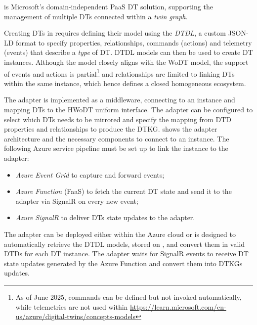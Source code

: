 \azureTwin{} is Microsoft's domain-independent \ac{PaaS} \ac{DT} solution, supporting the management of multiple \acp{DT} connected within a \emph{twin graph}.

Creating \acp{DT} in \azureTwin{} requires defining their model using the \emph{\acf{DTDL}}, a custom JSON-LD format to specify properties, relationships, commands (actions) and telemetry (events) that describe a \emph{type} of \ac{DT}.
%
\ac{DTDL} models can then be used to create \ac{DT} instances.
%
Although the model closely aligns with the \ac{WoDT} model, the support of events and actions is partial\footnote{As of June 2025, commands can be defined but not invoked automatically, while telemetries are not used within \azureTwin{} \url{https://learn.microsoft.com/en-us/azure/digital-twins/concepts-models}} and relationships are limited to linking \acp{DT} within the same \azureTwin{} instance, which hence defines a closed homogeneous ecosystem.

The \azureTwin{} adapter is implemented as a middleware, connecting to an \azureTwin{} instance and mapping \acp{DT} to the \ac{HWoDT} uniform interface.
%
The adapter can be configured to select which \acp{DT} needs to be mirrored and specify the mapping from \ac{DTD} properties and relationships to produce the \ac{DTKG}. 
%
 shows the adapter architecture and the necessary components to connect to an \azureTwin{} instance.
%
The following Azure service pipeline must be set up to link the \azureTwin{} instance to the adapter:
\begin{itemize}
    \item \textit{Azure Event Grid} to capture and forward \azureTwin{} events;
    \item \textit{Azure Function} (\acl{FaaS}) to fetch the current \ac{DT} state and send it to the adapter via SignalR on every new event;
    \item \textit{Azure SignalR} to deliver \acp{DT} state updates to the adapter.
\end{itemize}

The adapter can be deployed either within the Azure cloud or is designed to automatically retrieve the \ac{DTDL} models, stored on \azureTwin{}, and convert them in valid \acp{DTD} for each \ac{DT} instance.
The adapter waits for SignalR events to receive \ac{DT} state updates generated by the Azure Function and convert them into \acp{DTKG} updates.

